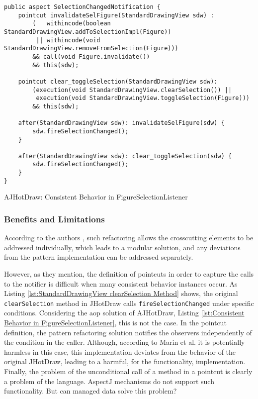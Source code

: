 \begin{sourcecode} [H]
	\begin{lstlisting}[language=AspectJ]
public aspect SelectionChangedNotification {
	pointcut invalidateSelFigure(StandardDrawingView sdw) :
		(   withincode(boolean StandardDrawingView.addToSelectionImpl(Figure)) 
		 || withincode(void StandardDrawingView.removeFromSelection(Figure)))
		&& call(void Figure.invalidate()) 
		&& this(sdw);

	pointcut clear_toggleSelection(StandardDrawingView sdw):
		(execution(void StandardDrawingView.clearSelection()) ||
		 execution(void StandardDrawingView.toggleSelection(Figure)))
		&& this(sdw);

	after(StandardDrawingView sdw): invalidateSelFigure(sdw) {
		sdw.fireSelectionChanged();
	}

	after(StandardDrawingView sdw): clear_toggleSelection(sdw) {
		sdw.fireSelectionChanged();
	}
}
	\end{lstlisting}
	\caption{AJHotDraw: Consistent Behavior in FigureSelectionListener}
	\label{lst:Consistent Behavior in FigureSelectionListener}
\end{sourcecode}

\subsubsection{Benefits and Limitations}
According to the authors \cite{marin2005approach}, such refactoring allows the crosscutting elements to be addressed individually, which leads to a modular solution, and any deviations from the pattern implementation can be addressed separately.

However, as they mention, the definition of pointcuts in order to capture the calls to the notifier is difficult when many consistent behavior instances occur. 
As Listing \ref{lst:StandardDrawingView clearSelection Method} shows, the original \texttt{clearSelection} method in JHotDraw calls \texttt{fireSelectionChanged} under specific conditions.
Considering the \ac{aop} solution of AJHotDraw, Listing \ref{lst:Consistent Behavior in FigureSelectionListener}, this is not the case.
In the pointcut definition, the pattern refactoring solution notifies the observers independently of the condition in the caller.
Although, according to Marin et al. it is potentially harmless in this case, this implementation deviates from the behavior of the original JHotDraw, leading to a harmful, for the functionality, implementation.
Finally, the problem of the unconditional call of a method in a pointcut is clearly a problem of the language.
AspectJ mechanisms do not support such functionality.
But can managed data solve this problem?

